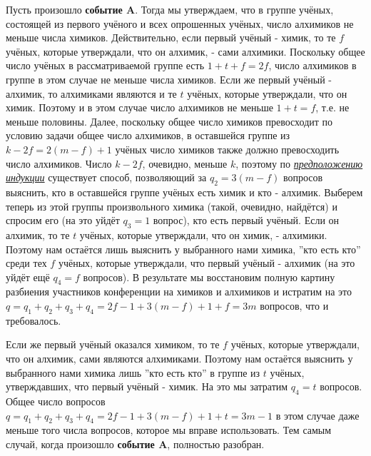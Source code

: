 \begin{prf}
    \par
    Пусть произошло \textbf{событие A}. Тогда мы утверждаем, что в группе учёных, состоящей из первого учёного и всех опрошенных учёных, число алхимиков не меньше числа химиков. Действительно, если первый учёный - химик, то те $f$ учёных, которые утверждали, что он алхимик, - сами алхимики. Поскольку общее число учёных в рассматриваемой группе есть $1 + t + f = 2f$, число алхимиков в группе в этом случае не меньше числа химиков. Если же первый учёный - алхимик, то алхимиками являются и те $t$ учёных, которые утверждали, что он химик. Поэтому и в этом случае число алхимиков не меньше $1 + t = f$, т.е. не меньше половины. Далее, поскольку общее число химиков превосходит по условию задачи общее число алхимиков, в оставшейся группе из $k - 2f = 2(m - f ) + 1$ учёных число химиков также должно превосходить число алхимиков. Число $k - 2f$, очевидно, меньше $k$, поэтому по \textit{\underline{предположению индукции}} существует способ, позволяющий за $q_2 = 3(m - f )$ вопросов выяснить, кто в оставшейся группе учёных есть химик и кто - алхимик. Выберем теперь из этой группы произвольного химика (такой, очевидно, найдётся) и спросим его (на это уйдёт $q_3 = 1$ вопрос), кто есть первый учёный. Если он алхимик, то те $t$ учёных, которые утверждали, что он химик, - алхимики. Поэтому нам остаётся лишь выяснить у выбранного нами химика, ''кто есть кто'' среди тех $f$ учёных, которые утверждали, что первый учёный - алхимик (на это уйдёт ещё $q_4 = f$ вопросов). В результате мы восстановим полную картину разбиения участников конференции на химиков и алхимиков и истратим на это $q = q_1 + q_2 + q_3 + q_4 = 2f - 1 + 3(m - f) + 1 + f = 3m$ вопросов, что и требовалось.
    \par
    Если же первый учёный оказался химиком, то те $f$ учёных, которые утверждали, что он алхимик, сами являются алхимиками. Поэтому нам остаётся выяснить у выбранного нами химика лишь ''кто есть кто'' в группе из $t$ учёных, утверждавших, что первый учёный - химик. На это мы затратим $q_4 = t$ вопросов. Общее число вопросов $q = q_1 + q_2 + q_3 + q_4 = 2f - 1 + 3(m - f ) + 1 + t = 3m - 1$ в этом случае даже меньше того числа вопросов, которое мы вправе использовать. Тем самым случай, когда произошло \textbf{событие A}, полностью разобран.
    \par

\end{prf}
